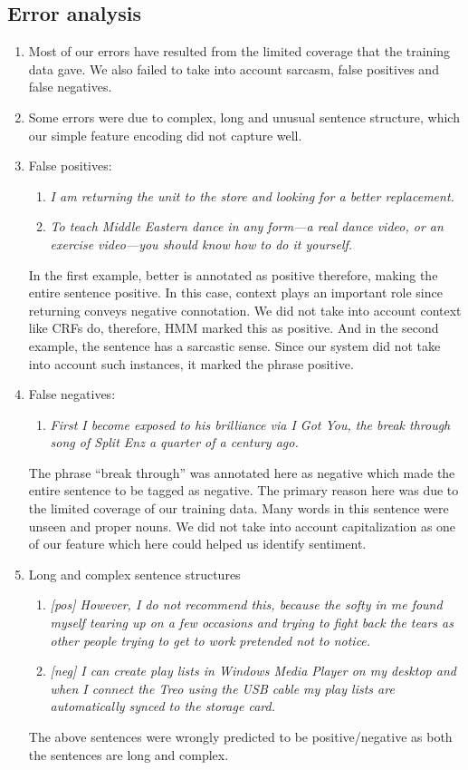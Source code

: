 \documentclass{article}
\begin{document}
\subsection{Error analysis}
\begin{enumerate}
\item Most of our errors have resulted from the limited coverage that the training data gave. We also failed to take into account sarcasm, false positives and false negatives.
\item Some errors were due to complex, long and unusual sentence structure, which our simple feature encoding did not capture well.
\item False positives:
  \begin{enumerate}
    \item \textit{I am returning the unit to the store and looking for a \emph{better} replacement.}
    \item \textit{To teach Middle Eastern dance in any form---a real dance video, or an exercise video---you should know how to do it yourself.}
  \end{enumerate}
  In the first example, better is annotated as positive therefore, making the entire sentence positive. In this case, context plays an important role since returning conveys negative connotation. We did not take into account context like CRFs do, therefore, HMM marked this as positive. And in the second example, the sentence has a sarcastic sense. Since our system did not take into account such instances, it marked the phrase positive. 
\item False negatives:
  \begin{enumerate}
  \item \textit{First I become exposed to his brilliance via I Got You, the break through song of Split Enz a quarter of a century ago.}
  \end{enumerate}
  The phrase ``break through'' was annotated here as negative which made the entire sentence to be tagged as negative. The primary reason here was due to the limited coverage of our training data. Many words in this sentence were unseen and proper nouns. We did not take into account capitalization as one of our feature which here could helped us identify sentiment.

\item Long and complex sentence structures
    \begin{enumerate}
    \item \textit{[pos] However, I do not recommend this, because the softy in me found myself tearing up on a few occasions and     trying to fight back the tears as other people trying to get to work pretended not to notice.      
    }
    \item \textit{[neg] I can create play lists in Windows Media Player on my desktop and when I connect the Treo using the USB     cable my play lists are automatically synced to the storage card.}
\end{enumerate}
The above sentences were wrongly predicted to be positive/negative as both the sentences are long and complex.
\end{enumerate} 
\end{document}
